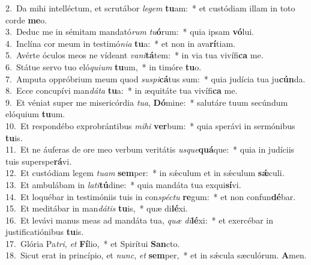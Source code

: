 {2.~}Da mihi intelléctum, et scrutábor \textit{le}\textit{gem} \textbf{tu}am:~* et custódiam illam in toto corde \textbf{me}o.\\
{3.~}Deduc me in sémitam mandató\textit{rum} \textit{tu}\textbf{ó}rum:~* quia ipsam \textbf{vó}lui.\\
{4.~}Inclína cor meum in testimó\textit{ni}\textit{a} \textbf{tu}a:~* et non in ava\textbf{rí}tiam.\\
{5.~}Avérte óculos meos ne vídeant \textit{va}\textit{ni}\textbf{tá}tem:~* in via tua vivífi\textbf{ca} me.\\
{6.~}Státue servo tuo eló\textit{qui}\textit{um} \textbf{tu}um,~* in timóre \textbf{tu}o.\\
{7.~}Amputa oppróbrium meum quod \textit{su}\textit{spi}\textbf{cá}tus sum:~* quia judícia tua ju\textbf{cún}da.\\
{8.~}Ecce concupívi man\textit{dá}\textit{ta} \textbf{tu}a:~* in æquitáte tua vivífi\textbf{ca} me.\\
{9.~}Et véniat super me misericórdia \textit{tu}\textit{a}, \textbf{Dó}mine:~* salutáre tuum secúndum elóquium \textbf{tu}um.\\
{10.~}Et respondébo exprobrántibus \textit{mi}\textit{hi} \textbf{ver}bum:~* quia sperávi in sermónibus \textbf{tu}is.\\
{11.~}Et ne áuferas de ore meo verbum veritátis \textit{us}\textit{que}\textbf{quá}que:~* quia in judíciis tuis superspe\textbf{rá}vi.\\
{12.~}Et custódiam legem \textit{tu}\textit{am} \textbf{sem}per:~* in sǽculum et in sǽculum \textbf{sǽ}culi.\\
{13.~}Et ambulábam in \textit{la}\textit{ti}\textbf{tú}dine:~* quia mandáta tua exqui\textbf{sí}vi.\\
{14.~}Et loquébar in testimóniis tuis in con\textit{spé}\textit{ctu} \textbf{re}gum:~* et non confun\textbf{dé}bar.\\
{15.~}Et meditábar in man\textit{dá}\textit{tis} \textbf{tu}is,~* quæ di\textbf{lé}xi.\\
{16.~}Et levávi manus meas ad mandáta tua, \textit{quæ} \textit{di}\textbf{lé}xi:~* et exercébar in justificatiónibus \textbf{tu}is.\\
{17.~}Glória Pa\textit{tri}, \textit{et} \textbf{Fí}lio,~* et Spirítui \textbf{San}cto.\\
{18.~}Sicut erat in princípio, et \textit{nunc}, \textit{et} \textbf{sem}per,~* et in sǽcula sæculórum. \textbf{A}men.\\
